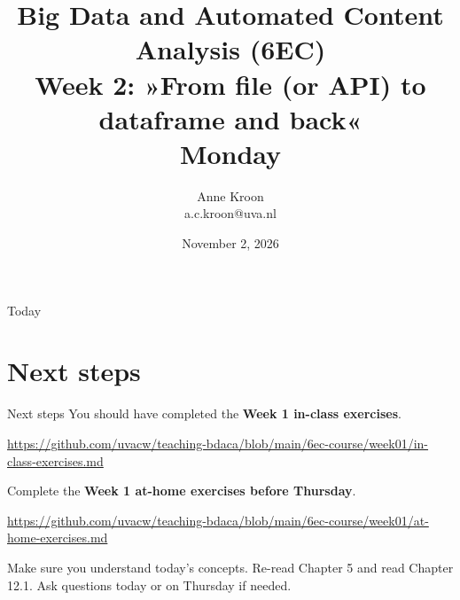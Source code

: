 \documentclass[compress]{beamer}
\begin{document}
\title[Big Data and Automated Content Analysis]{\textbf{Big Data and Automated Content Analysis (6EC)} 
\\Week 2: »From file (or API) to dataframe and back«
\\Monday }
\author[Anne Kroon]{Anne Kroon\\ \footnotesize{a.c.kroon@uva.nl \\}}
\date{November 2, 2026}


\begin{frame}{}
	\titlepage
\end{frame}

\begin{frame}{Today}
	\tableofcontents
\end{frame}

	








\section{Next steps}




\begin{frame}{Next steps}
You should have completed the \textbf{Week 1 in-class exercises}.

{\scriptsize\url{https://github.com/uvacw/teaching-bdaca/blob/main/6ec-course/week01/in-class-exercises.md}\par}

\medskip
Complete the \textbf{Week 1 at-home exercises before Thursday}.

{\scriptsize\url{https://github.com/uvacw/teaching-bdaca/blob/main/6ec-course/week01/at-home-exercises.md}\par}

\medskip
Make sure you understand today's concepts. Re-read Chapter 5 and read Chapter 12.1. Ask questions today or on Thursday if needed.
\end{frame}






\begin{frame}
	\printbibliography
\end{frame}
\end{document}
